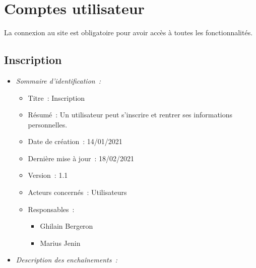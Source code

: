 \section{Comptes utilisateur}

La connexion au site est obligatoire pour avoir accès à toutes les fonctionnalités.

\subsection{Inscription}\label{subsec:inscription}

\begin{itemize}

\item \textit{Sommaire d'identification~:}

    \begin{itemize}
    
    \item Titre~: Inscription
    
    \item Résumé~: Un utilisateur peut s'inscrire et rentrer ses informations personnelles. 
    
    \item Date de création~: 14/01/2021
    
    \item Dernière mise à jour~: 18/02/2021
    
    \item Version~: 1.1
    
    \item Acteurs concernés~: Utilisateurs
    
    \item Responsables~:
    
        \begin{itemize}
            \item Ghilain Bergeron
            \item Marius Jenin
        \end{itemize}
    
    \end{itemize}

\item \textit{Description des enchaînements~:}


\end{itemize}
